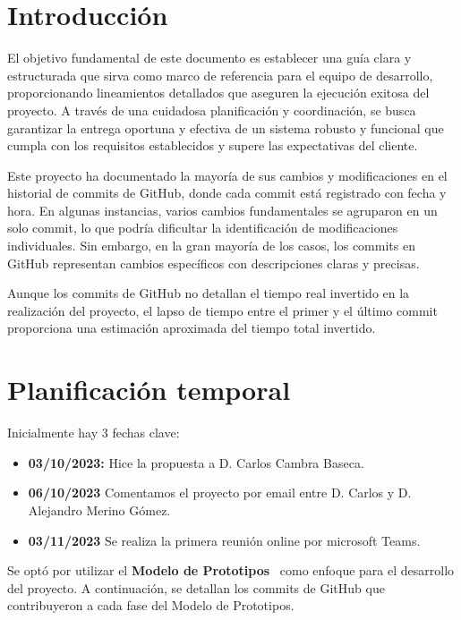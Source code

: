 
\section{Introducción}
El objetivo fundamental de este documento es establecer una guía clara y estructurada que sirva como marco de referencia para el equipo de desarrollo, proporcionando lineamientos detallados que aseguren la ejecución exitosa del proyecto. A través de una cuidadosa planificación y coordinación, se busca garantizar la entrega oportuna y efectiva de un sistema robusto y funcional que cumpla con los requisitos establecidos y supere las expectativas del cliente.

Este proyecto ha documentado la mayoría de sus cambios y modificaciones en el historial de commits de GitHub, donde cada commit está registrado con fecha y hora. En algunas instancias, varios cambios fundamentales se agruparon en un solo commit, lo que podría dificultar la identificación de modificaciones individuales. Sin embargo, en la gran mayoría de los casos, los commits en GitHub representan cambios específicos con descripciones claras y precisas.

Aunque los commits de GitHub no detallan el tiempo real invertido en la realización del proyecto, el lapso de tiempo entre el primer y el último commit proporciona una estimación aproximada del tiempo total invertido.

\section{Planificación temporal}
Inicialmente hay 3 fechas clave:
\begin{itemize}
	\item \textbf{03/10/2023:} Hice la propuesta a D. Carlos Cambra Baseca.
	\item \textbf{06/10/2023} Comentamos el proyecto por email entre D. Carlos y D. Alejandro Merino Gómez.
	\item \textbf{03/11/2023} Se realiza la primera reunión online por microsoft Teams.
\end{itemize}

Se optó por utilizar el \textbf{Modelo de Prototipos}~\cite{misc:MetodologiaModeloDePrototipos} como enfoque para el desarrollo del proyecto. A continuación, se detallan los commits de GitHub que contribuyeron a cada fase del Modelo de Prototipos.
